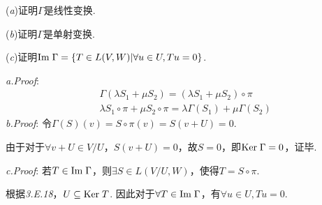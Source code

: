 (\textit{a})证明\(\Gamma\)是线性变换.

(\textit{b})证明\(\Gamma\)是单射变换.

(\textit{c})证明\(\mathrm{Im \;}  \Gamma=\{T \in L(V,W)|\forall u \in U,Tu=0 \}\).

\textit{a.Proof}:
    \begin{align*}
        &\Gamma(\lambda S_1+\mu S_2)=(\lambda S_1+\mu S_2) \circ \pi \\
        &\lambda S_1 \circ \pi+\mu S_2 \circ \pi=\lambda \Gamma(S_1)+\mu \Gamma(S_2)
    \end{align*}
\textit{b.Proof}:
令\(\Gamma(S)(v)=S \circ \pi(v)=S(v+U)=0\).

由于对于\(\forall v+U \in V/U\)，\(S(v+U)=0\)，故\(S=0\)，即\(\mathrm{Ker \;}  \Gamma=0\)，证毕.

\textit{c.Proof}:
若\(T \in \mathrm{Im \;}  \Gamma\)，则\(\exists S \in L(V/U,W)\)，使得\(T=S \circ \pi\).

根据\textit{3.E.18}，\(U \subseteq \mathrm{Ker \;} T\).
因此对于\(\forall T \in \mathrm{Im \;} \Gamma\)，有\(\forall u \in U,Tu=0\).

